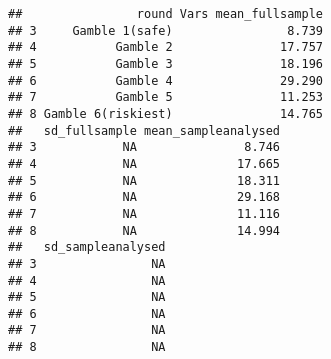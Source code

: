 \documentclass[]{tufte-handout}
\newenvironment{Shaded}{\begin{snugshade}}{\end{snugshade}}
\newcommand{\KeywordTok}[1]{\textcolor[rgb]{0.13,0.29,0.53}{\textbf{#1}}}
\newcommand{\DataTypeTok}[1]{\textcolor[rgb]{0.13,0.29,0.53}{#1}}
\newcommand{\DecValTok}[1]{\textcolor[rgb]{0.00,0.00,0.81}{#1}}
\newcommand{\StringTok}[1]{\textcolor[rgb]{0.31,0.60,0.02}{#1}}
\newcommand{\OperatorTok}[1]{\textcolor[rgb]{0.81,0.36,0.00}{\textbf{#1}}}
\newcommand{\NormalTok}[1]{#1}
\begin{document}
\begin{verbatim}
##                round Vars mean_fullsample
## 3     Gamble 1(safe)                8.739
## 4           Gamble 2               17.757
## 5           Gamble 3               18.196
## 6           Gamble 4               29.290
## 7           Gamble 5               11.253
## 8 Gamble 6(riskiest)               14.765
##   sd_fullsample mean_sampleanalysed
## 3            NA               8.746
## 4            NA              17.665
## 5            NA              18.311
## 6            NA              29.168
## 7            NA              11.116
## 8            NA              14.994
##   sd_sampleanalysed
## 3                NA
## 4                NA
## 5                NA
## 6                NA
## 7                NA
## 8                NA
\end{verbatim}

\begin{Shaded}
\end{Shaded}
\end{document}

